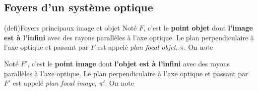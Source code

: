 \documentclass[../../main/main.tex]{subfiles}
\begin{document}
\subsection{Foyers d'un système optique}

\begin{tcb}[label=def:foy, sidebyside, sidebyside align=top](defi){Foyers
			principaux image et objet}
	Noté $F$, c'est le \textbf{point objet} dont \textbf{l'image est à l'infini}
	avec des rayons parallèles à l'axe optique.
	\smallbreak
	Le plan perpendiculaire à l'axe optique et passant par $F$ est appelé
	\textit{plan focal objet}, $\pi$. On note
	\smallbreak
	\begin{center}
	\end{center}
	\tcblower
	Noté $F'$, c'est le \textbf{point image} dont \textbf{l'objet est à l'infini}
	avec des rayons parallèles à l'axe optique.
	\smallbreak
	Le plan perpendiculaire à l'axe optique
	et passant par $F'$ est appelé \textit{plan focal image}, $\pi'$. On note
	\smallbreak
	\begin{center}
	\end{center}
\end{tcb}
\end{document}

